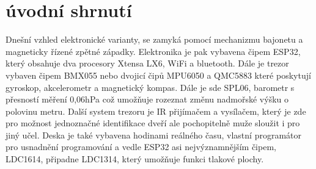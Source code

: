 \section*{úvodní shrnutí}

Dnešní vzhled elektronické varianty, se zamyká pomocí mechanizmu bajonetu a magneticky řízené zpětné západky. Elektronika je pak vybavena čipem ESP32,
který obsahuje dva procesory Xtensa LX6, WiFi a bluetooth. Dále je trezor vybaven čipem BMX055 nebo dvojicí čipů MPU6050 a QMC5883 které poskytují 
gyroskop, akcelerometr a magnetický kompas. Dále je sde SPL06, barometr s přesností měření 0,06hPa což umožňuje rozeznat změnu nadmořské výšku 
o polovinu metru. Další system trezoru je IR přijímačem a vysílačem, který je zde pro možnost jednoznačné identifikace dveří ale pochopitelně muže 
sloužit i pro jiný učel. Deska je také vybavena hodinami reálného času, vlastní programátor pro usnadnění programování a vedle ESP32 asi 
nejvýznamnějším čipem, LDC1614, připadne LDC1314, který umožňuje funkci tlakové plochy.

\begin{table}[h]
    \centering
    \caption{shrnutí elektronického vybavení}
    \label{tab:COMPARATION}
\end{table}

